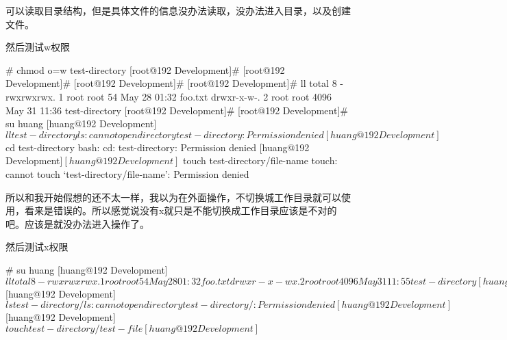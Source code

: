 
可以读取目录结构，但是具体文件的信息没办法读取，没办法进入目录，以及创建文件。

然后测试w权限

\begin{Bash}# chmod o=w test-directory
[root@192 Development]# 
[root@192 Development]# 
[root@192 Development]# 
[root@192 Development]# ll
total 8
-rwxrwxrwx. 1 root root   54 May 28 01:32 foo.txt
drwxr-x-w-. 2 root root 4096 May 31 11:36 test-directory
[root@192 Development]# 
[root@192 Development]# su huang
[huang@192 Development]$ ll test-directory
ls: cannot open directory test-directory: Permission denied
[huang@192 Development]$ cd test-directory
bash: cd: test-directory: Permission denied
[huang@192 Development]$ 
[huang@192 Development]$ touch test-directory/file-name
touch: cannot touch ‘test-directory/file-name’: Permission denied

\end{Bash}

所以和我开始假想的还不太一样，我以为在外面操作，不切换城工作目录就可以使用，看来是错误的。所以感觉说没有x就只是不能切换成工作目录应该是不对的吧。应该是就没办法进入操作了。


然后测试x权限

\begin{Bash}# su huang
[huang@192 Development]$ ll
total 8
-rwxrwxrwx. 1 root root   54 May 28 01:32 foo.txt
drwxr-x-wx. 2 root root 4096 May 31 11:55 test-directory
[huang@192 Development]$ 
[huang@192 Development]$ ls test-directory/
ls: cannot open directory test-directory/: Permission denied
[huang@192 Development]$ 
[huang@192 Development]$ touch test-directory/test-file
[huang@192 Development]$ 

\end{Bash}

